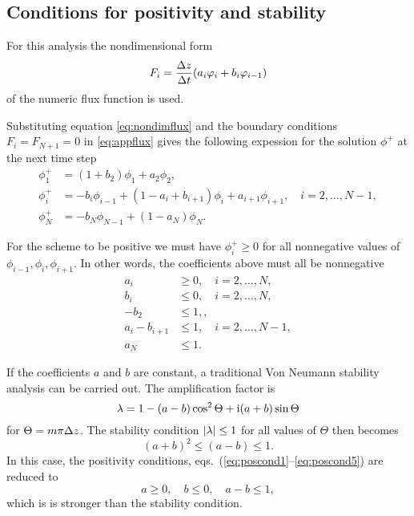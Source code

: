 \subsection{Conditions for positivity and stability}\label{app:pos}

For this analysis the nondimensional form
\begin{equation}\label{eq:nondimflux}
   F_i = \frac{\Delta z}{\Delta t} ( a_i \varphi_i + b_i \varphi_{i-1} )
\end{equation}
of the numeric flux function is used.

Substituting equation \eqref{eq:nondimflux} and the boundary conditions
$F_i = F_{N+1} = 0$ in \eqref{eq:appflux} gives the following expession
for the solution $\phi^+$ at the next time step 
\begin{align}
  \phi_1^+ & = (1 + b_2) \phi_1 + a_2 \phi_2, \\
  \phi_i^+ & = - b_i \phi_{i-1} + (1 - a_i + b_{i+1}) \phi_i 
             + a_{i+1} \phi_{i+1} , \quad i = 2, \dots, N-1, 
              \label{eq:aftersubst2} \\
  \phi_N^+ & = -b_N \phi_{N-1} + (1 - a_N) \phi_N .             
\end{align}


For the scheme to be positive we must have $\phi_i^+ \ge 0$ for all
nonnegative values of $\phi_{i-1}, \phi_i, \phi_{i+1}$.
In other words, the coefficients above must all be nonnegative
\begin{align}
   a_{i} & \ge 0, \quad i = 2, \dots, N, \label{eq:poscond1}\\
   b_i   & \le 0, \quad i = 2, \dots, N, \\
   - b_2 & \le 1, \label{eq:poscond3} ,\\ 
   a_i - b_{i+1} & \le 1, \quad i = 2, \dots, N-1, \\
   a_N           & \le 1 . \label{eq:poscond5} 
\end{align}

If the coefficients $a$ and $b$ are constant, a traditional Von Neumann
stability analysis can be carried out. The amplification factor is
\begin{equation}
  \lambda = 1-(a-b)\cos^2\Theta  + \mathrm{i} (a+b)\sin \Theta
\end{equation}
for $\Theta = m \pi \Delta z$. The stability condition $|\lambda| \le 1$
for all values of $\Theta$ then becomes
\begin{equation}
  (a+b)^2 \le (a-b) \le 1 .
\end{equation}
In this case, the positivity conditions,
eqs.~(\ref{eq:poscond1}--\ref{eq:poscond5}) are reduced to
\begin{equation}
  a \ge 0, \quad b \le 0, \quad a - b \le 1 ,
\end{equation}
which is is stronger than the stability condition.


